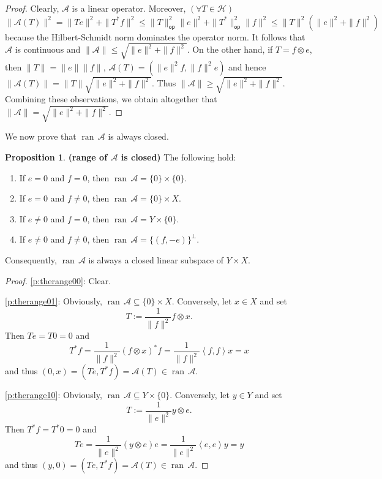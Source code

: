\documentclass[12pt]{article}
\newcommand{\scal}[2]{\left\langle{#1},{#2}  \right\rangle}
\newcommand{\ran}{\ensuremath{{\operatorname{ran}}\,}}
\theoremstyle{definition}
\newtheorem{proposition}[theorem]{Proposition}
\providecommand{\ran}{\operatorname{ran}}
\providecommand{\ran}{\operatorname{ran}}
\providecommand{\mA}{\mathcal{A}}
\begin{document}
{{\begin{proof}
Clearly, $\mA$ is a linear operator.
Moreover, $(\forall T\in\mathcal{H})$ 
$\|\mathcal{A}(T)\|^2 = \|Te\|^2 + \|T^*f\|^2
\leq \|T\|_{\textsf{op}}^2\|e\|^2+
\|T^*\|_{\textsf{op}}^2\|f\|^2
\leq \|T\|^2(\|e\|^2+\|f\|^2)$ 
because the Hilbert-Schmidt norm dominates the operator norm.
It follows that $\mathcal{A}$ is continuous and 
$\|\mathcal{A}\|\leq \sqrt{\|e\|^2+\|f\|^2}$.
On the other hand,
if $T = f\otimes e$,
then 
$\|T\| = \|e\|\|f\|$, 
$\mA(T) = (\|e\|^2f,\|f\|^2e)$ and hence 
$\|\mA(T)\|=\|T\|\sqrt{\|e\|^2+\|f\|^2}$. 
Thus $\|\mA\| \geq \sqrt{\|e\|^2+\|f\|^2}$.
Combining these observations, we obtain 
altogether that 
$\|\mA\| = \sqrt{\|e\|^2+\|f\|^2}$. 
\end{proof}
}

We now prove that $\ran\mA$ is always closed. 

\begin{proposition}\textbf{(range of $\mA$ is closed)}
\label{p:therange}
The following hold:
\begin{enumerate}
\item 
\label{p:therange00}
If $e=0$ and $f=0$,  then 
$\ran\mA = \{0\}\times\{0\}$.
\item
\label{p:therange01}
If $e=0$ and $f\neq 0$, then 
$\ran\mA = \{0\}\times X$.
\item
\label{p:therange10}
If $e\neq 0$ and $f=0$, then 
$\ran\mA = Y\times \{0\}$. 
\item
\label{p:therange11}
If $e\neq 0$ and $f\neq 0$, then 
$\ran\mA = \{(f,-e)\}^\perp$. 
\end{enumerate}
Consequently, $\ran\mA$ is always 
a closed linear subspace of $Y\times X$. 
\end{proposition}
\begin{proof}
\cref{p:therange00}: Clear. 

\cref{p:therange01}: 
Obviously, $\ran\mA\subseteq \{0\}\times X$.
Conversely, let $x\in X$ and set
\begin{equation}
T := \frac{1}{\|f\|^2}f\otimes x.
\end{equation}
Then $Te=T0 = 0$ and 
\begin{equation}
T^*f = \frac{1}{\|f\|^2}(f\otimes x)^*f
= \frac{1}{\|f\|^2}\scal{f}{f}x = x
\end{equation}
and thus 
$(0,x)=(Te,T^*f)=\mA(T)\in\ran\mA$.

\cref{p:therange10}: 
Obviously, $\ran\mA\subseteq Y\times \{0\}$.
Conversely, let $y\in Y$ and set
\begin{equation}
T := \frac{1}{\|e\|^2}y\otimes e.
\end{equation}
Then $T^*f=T^*0 = 0$ and 
\begin{equation}
Te = \frac{1}{\|e\|^2}(y\otimes e)e
= \frac{1}{\|e\|^2}\scal{e}{e}y = y
\end{equation}
and thus 
$(y,0)=(Te,T^*f)=\mA(T)\in\ran\mA$.


\end{proof}}
\end{document}
